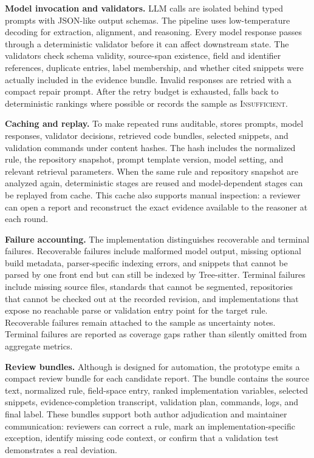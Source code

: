 \textbf{Model invocation and validators.}
LLM calls are isolated behind typed prompts with JSON-like output schemas. The
pipeline uses low-temperature decoding for extraction, alignment, and
reasoning. Every model response passes through a deterministic validator before
it can affect downstream state. The validators check schema validity,
source-span existence, field and identifier references, duplicate entries,
label membership, and whether cited snippets were actually included in the
evidence bundle. Invalid responses are retried with a compact repair prompt.
After the retry budget is exhausted, \tool{} falls back to deterministic
rankings where possible or records the sample as \textsc{Insufficient}.

\textbf{Caching and replay.}
To make repeated runs auditable, \tool{} stores prompts, model responses,
validator decisions, retrieved code bundles, selected snippets, and validation
commands under content hashes. The hash includes the normalized rule, the
repository snapshot, prompt template version, model setting, and relevant
retrieval parameters. When the same rule and repository snapshot are analyzed
again, deterministic stages are reused and model-dependent stages can be
replayed from cache. This cache also supports manual inspection: a reviewer can
open a report and reconstruct the exact evidence available to the reasoner at
each round.

\textbf{Failure accounting.}
The implementation distinguishes recoverable and terminal failures. Recoverable
failures include malformed model output, missing optional build metadata,
parser-specific indexing errors, and snippets that cannot be parsed by one
front end but can still be indexed by Tree-sitter. Terminal failures include
missing source files, standards that cannot be segmented, repositories that
cannot be checked out at the recorded revision, and implementations that expose
no reachable parse or validation entry point for the target rule. Recoverable
failures remain attached to the sample as uncertainty notes. Terminal failures
are reported as coverage gaps rather than silently omitted from aggregate
metrics.

\textbf{Review bundles.}
Although \tool{} is designed for automation, the prototype emits a compact
review bundle for each candidate report. The bundle contains the source text,
normalized rule, field-space entry, ranked implementation variables, selected
snippets, evidence-completion transcript, validation plan, commands, logs, and
final label. These bundles support both author adjudication and maintainer
communication: reviewers can correct a rule, mark an implementation-specific
exception, identify missing code context, or confirm that a validation test
demonstrates a real deviation.

